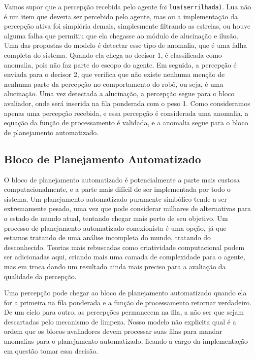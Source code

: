 \begin{example}
    Vamos supor que a percepção recebida pelo agente foi \texttt{lua(serrilhada)}. Lua não é um item que deveria ser percebido pelo agente, mas ou a implementação da percepção ativa foi simplória demais, simplesmente filtrando as estrelas, ou houve alguma falha que permitiu que ela chegasse ao módulo de alucinação e ilusão. Uma das propostas do modelo é detectar esse tipo de anomalia, que é uma falha completa do sistema. Quando ela chega ao decisor 1, é classificada como anomalia, pois não faz parte do escopo do agente. Em seguida, a percepção é enviada para o decisor 2, que verifica que não existe nenhuma menção de nenhuma parte da percepção no comportamento do robô, ou seja, é uma alucinação. Uma vez detectada a alucinação, a percepção segue para o bloco avaliador, onde será inserida na fila ponderada com o peso 1. Como consideramos apenas uma percepção recebida, e essa percepção é considerada uma anomalia, a equação da função de processamento é validada, e a anomalia segue para o bloco de planejamento automatizado.
\end{example}{}

\subsection{Bloco de Planejamento Automatizado}

O bloco de planejamento automatizado é potencialmente a parte mais custosa computacionalmente, e a parte mais difícil de ser implementada por todo o sistema. Um planejamento automatizado puramente simbólico tende a ser extremamente pesado, uma vez que pode considerar milhares de alternativas para o estado de mundo atual, tentando chegar mais perto de seu objetivo. Um processo de planejamento automatizado conexionista é uma opção, já que estamos tratando de uma análise incompleta do mundo, tratando do desconhecido. Teorias mais rebuscadas como criatividade computacional\cite{colton2012computational} podem ser adicionadas aqui, criando mais uma camada de complexidade para o agente, mas em troca dando um resultado ainda mais preciso para a avaliação da qualidade da percepção.

Uma percepção pode chegar ao bloco de planejamento automatizado quando ela for a primeira na fila ponderada e a função de processamento retornar verdadeiro. De um ciclo para outro, as percepções permanecem na fila, a não ser que sejam descartadas pelo mecanismo de limpeza. Nosso modelo não explicita qual é a ordem que os blocos avaliadores devem processar suas filas para mandar anomalias para o planejamento automatizado, ficando a cargo da implementação em questão tomar essa decisão.


